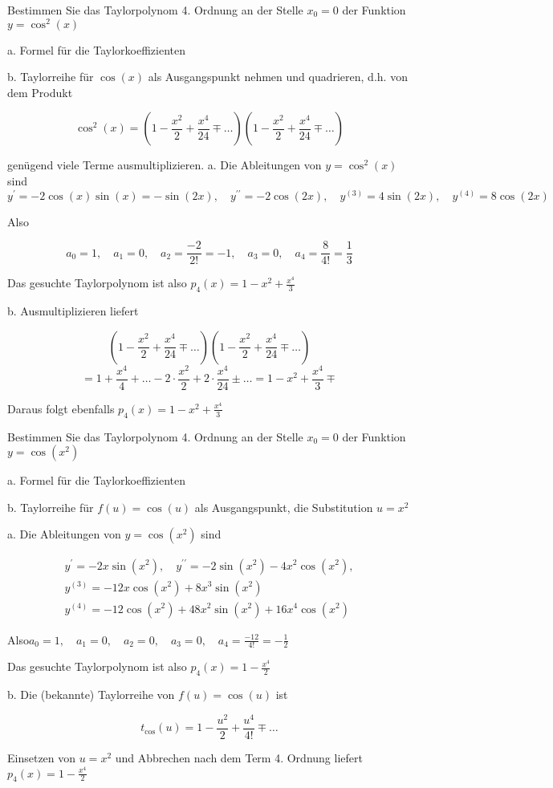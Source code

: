 \begin{example}
    Bestimmen Sie das Taylorpolynom 4. Ordnung an der Stelle $x_{0}=0$ der Funktion $y=\cos ^{2}(x)$

a. Formel für die Taylorkoeffizienten 

b. Taylorreihe für $\cos (x)$ als Ausgangspunkt nehmen und quadrieren, d.h. von dem Produkt

$$
\cos ^{2}(x)=\left(1-\frac{x^{2}}{2}+\frac{x^{4}}{24} \mp \ldots\right)\left(1-\frac{x^{2}}{2}+\frac{x^{4}}{24} \mp \ldots\right)
$$

genügend viele Terme ausmultiplizieren.
\tcblower
a. Die Ableitungen von $y=\cos ^{2}(x)$ sind $y^{\prime}=-2 \cos (x) \sin (x)=-\sin (2 x), \quad y^{\prime \prime}=-2 \cos (2 x), \quad y^{(3)}=4 \sin (2 x), \quad y^{(4)}=8 \cos (2 x)$

Also

$$
a_{0}=1, \quad a_{1}=0, \quad a_{2}=\frac{-2}{2!}=-1, \quad a_{3}=0, \quad a_{4}=\frac{8}{4!}=\frac{1}{3}
$$

Das gesuchte Taylorpolynom ist also 
$
p_{4}(x)=1-x^{2}+\frac{x^{4}}{3}
$

b. Ausmultiplizieren liefert

$$
\left(1-\frac{x^{2}}{2}+\frac{x^{4}}{24} \mp \ldots\right)\left(1-\frac{x^{2}}{2}+\frac{x^{4}}{24} \mp \ldots\right)$$ $$=1+\frac{x^{4}}{4}+\ldots-2 \cdot \frac{x^{2}}{2}+2 \cdot \frac{x^{4}}{24} \pm \ldots=1-x^{2}+\frac{x^{4}}{3} \mp
$$

Daraus folgt ebenfalls
$
p_{4}(x)=1-x^{2}+\frac{x^{4}}{3}
$
\end{example}

\begin{example}
    Bestimmen Sie das Taylorpolynom 4. Ordnung an der Stelle $x_{0}=0$ der Funktion $y=\cos \left(x^{2}\right)$

a. Formel für die Taylorkoeffizienten 

b. Taylorreihe für $f(u)=\cos (u)$ als Ausgangspunkt, die Substitution $u=x^{2}$ 
\tcblower

a. Die Ableitungen von $y=\cos \left(x^{2}\right)$ sind

$$
\begin{gathered}
y^{\prime}=-2 x \sin \left(x^{2}\right), \quad y^{\prime \prime}=-2 \sin \left(x^{2}\right)-4 x^{2} \cos \left(x^{2}\right), \\ y^{(3)}=-12 x \cos \left(x^{2}\right)+8 x^{3} \sin \left(x^{2}\right) \\
y^{(4)}=-12 \cos \left(x^{2}\right)+48 x^{2} \sin \left(x^{2}\right)+16 x^{4} \cos \left(x^{2}\right)
\end{gathered}
$$

Also$a_{0}=1, \quad a_{1}=0, \quad a_{2}=0, \quad a_{3}=0, \quad a_{4}=\frac{-12}{4!}=-\frac{1}{2}$

Das gesuchte Taylorpolynom ist also $p_{4}(x)=1-\frac{x^{4}}{2}
$

b. Die (bekannte) Taylorreihe von $f(u)=\cos (u)$ ist

$$
t_{\cos }(u)=1-\frac{u^{2}}{2}+\frac{u^{4}}{4!} \mp \ldots
$$

Einsetzen von $u=x^{2}$ und Abbrechen nach dem Term 4. Ordnung liefert
$
p_{4}(x)=1-\frac{x^{4}}{2}
$
\end{example}

